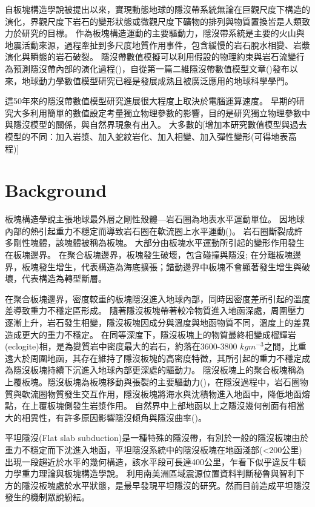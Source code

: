 自板塊構造學說被提出以來，實現動態地球的隱沒帶系統無論在巨觀尺度下構造的演化，界觀尺度下岩石的變形狀態或微觀尺度下礦物的排列與物質置換皆是人類致力於研究的目標。
作為板塊構造運動的主要驅動力，隱沒帶系統是主要的火山與地震活動來源，過程牽扯到多尺度地質作用事件，包含緩慢的岩石脫水相變、岩漿演化與瞬態的岩石破裂。
隱沒帶數值模擬可以利用假設的物理約束與岩石流變行為預測隱沒帶內部的演化過程(\citealp{Gerya2011})，自從第一篇二維隱沒帶數值模型文章(\citealp{minear1970thermal})發布以來，地球動力學數值模型研究已經是發展成熟且被廣泛應用的地球科學學門。

這50年來的隱沒帶數值模型研究進展很大程度上取決於電腦運算速度。
早期的研究大多利用簡單的數值設定考量獨立物理參數的影響，目的是研究獨立物理參數中與隱沒模型的關係，與自然界現象有出入。
大多數的[增加本研究數值模型與過去模型的不同：加入岩漿、加入蛇紋岩化、加入相變、加入彈性變形(可得地表高程)]

\section{Background}

板塊構造學說主張地球最外層之剛性殼體---岩石圈為地表水平運動單位。
因地球內部的熱引起重力不穩定而導致岩石圈在軟流圈上水平運動(\citealp{jordan1978composition})。
岩石圈斷裂成許多剛性塊體，該塊體被稱為板塊。
大部分由板塊水平運動所引起的變形作用發生在板塊邊界。
在聚合板塊邊界，板塊發生破壞，包含碰撞與隱沒; 在分離板塊邊界，板塊發生增生，代表構造為海底擴張；錯動邊界中板塊不會顯著發生增生與破壞，代表構造為轉型斷層。

在聚合板塊邊界，密度較重的板塊隱沒進入地球內部，同時因密度差所引起的溫度差導致重力不穩定區形成。
隨著隱沒板塊帶著較冷物質進入地函深處，周圍壓力逐漸上升，岩石發生相變，隱沒板塊因成分與溫度與地函物質不同，溫度上的差異造成更大的重力不穩定。
在同等深度下，隱沒板塊上的物質最終相變成榴輝岩(eclogite)相，是為變質岩中密度最大的岩石，約落在3600-3800 $kg m^{-3}$之間，比重遠大於周圍地函，其存在維持了隱沒板塊的高密度特徵，其所引起的重力不穩定成為隱沒板塊持續下沉進入地球內部更深處的驅動力。
隱沒板塊上的聚合板塊稱為上覆板塊。隱沒板塊為板塊移動與張裂的主要驅動力(\citealp{turcotte2002geodynamics})，在隱沒過程中，岩石圈物質與軟流圈物質發生交互作用，隱沒板塊將海水與沈積物進入地函中，降低地函熔點，在上覆板塊側發生岩漿作用。
自然界中上部地函以上之隱沒幾何剖面有相當大的相異性，有許多原因影響隱沒傾角與隱沒曲率(\citealp{schellart2020control})。

平坦隱沒(Flat slab subduction)是一種特殊的隱沒帶，有別於一般的隱沒板塊由於重力不穩定而下沈進入地函，平坦隱沒系統中的隱沒板塊在地函淺部(<200公里)出現一段趨近於水平的幾何構造，該水平段可長達400公里，乍看下似乎違反牛頓力學重力理論與板塊構造學說。
\citealp{barazangi1976}利用南美洲區域震源位置資料判斷秘魯與智利下方的隱沒板塊處於水平狀態，是最早發現平坦隱沒的研究。然而目前造成平坦隱沒發生的機制眾說紛紜。

